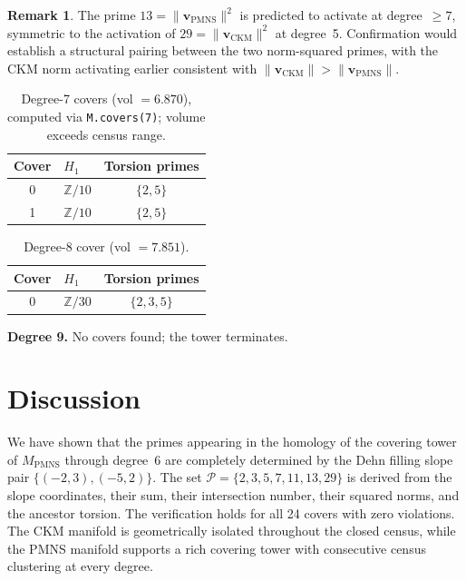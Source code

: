 \documentclass[12pt]{article}
\theoremstyle{definition}
\newtheorem{remark}[theorem]{Remark}
\begin{document}
\begin{remark}
The prime $13 = \|\mathbf{v}_{\mathrm{PMNS}}\|^2$ is predicted to
activate at degree~$\geq 7$, symmetric to the activation of
$29 = \|\mathbf{v}_{\mathrm{CKM}}\|^2$ at degree~5. Confirmation would
establish a structural pairing between the two norm-squared primes,
with the CKM norm activating earlier consistent with
$\|\mathbf{v}_{\mathrm{CKM}}\| > \|\mathbf{v}_{\mathrm{PMNS}}\|$.
\end{remark}

\begin{table}[htbp]
\centering
\caption{Degree-7 covers (vol $= 6.870$), computed via
\texttt{M.covers(7)}; volume exceeds census range.}
\label{tab:deg7}
\begin{tabular}{clc}
\toprule
Cover & $H_1$ & Torsion primes \\
\midrule
0 & $\mathbb{Z}/10$ & $\{2,5\}$ \\
1 & $\mathbb{Z}/10$ & $\{2,5\}$ \\
\bottomrule
\end{tabular}
\end{table}

\begin{table}[htbp]
\centering
\caption{Degree-8 cover (vol $= 7.851$).}
\label{tab:deg8}
\begin{tabular}{clc}
\toprule
Cover & $H_1$ & Torsion primes \\
\midrule
0 & $\mathbb{Z}/30$ & $\{2,3,5\}$ \\
\bottomrule
\end{tabular}
\end{table}

\noindent\textbf{Degree 9.} No covers found; the tower terminates.

\section{Discussion}
\label{sec:conclusion}

We have shown that the primes appearing in the homology of the covering
tower of $M_{\mathrm{PMNS}}$ through degree~6 are completely determined
by the Dehn filling slope pair $\{(-2,3),(-5,2)\}$. The set
$\mathcal{P} = \{2,3,5,7,11,13,29\}$ is derived from the slope
coordinates, their sum, their intersection number, their squared norms,
and the ancestor torsion. The verification holds for all 24 covers with
zero violations. The CKM manifold is geometrically isolated throughout
the closed census, while the PMNS manifold supports a rich covering
tower with consecutive census clustering at every degree.
\end{document}

